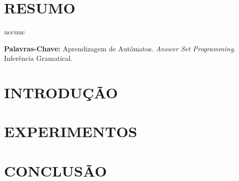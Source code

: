 \documentclass[a0,portrait,brazil]{a0poster}
\begin{document}
\begin{multicols}{3} 

\color{black} 
\begin{large}
\section*{RESUMO}
uccuuc
\vspace{0.1cm}

\textbf{Palavras-Chave:} Aprendizagem de Autômatos. \textit{Answer Set Programming}. Inferência Gramatical.

\color{black}
\section*{INTRODUÇÃO}

\cite{Gebser}
\lipsum[1-3] %



\color{black} 
\section*{EXPERIMENTOS}

\lipsum[1-5] %



\color{black}
\section*{CONCLUSÃO}

\lipsum[1-3] %




\vspace{-1cm}
\color{black}
\renewcommand{\refname}{REFERÊNCIAS}


\end{large}
\end{multicols}
\end{document}
